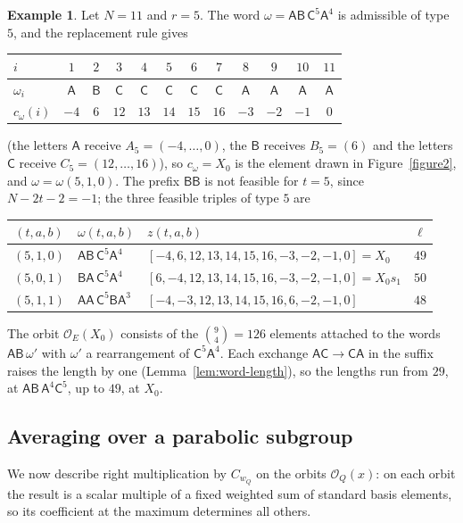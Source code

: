 \documentclass[11pt,a4paper,reqno]{amsart}
\numberwithin{equation}{section}
\theoremstyle{definition}
\newtheorem{example}[theorem]{Example}
\theoremstyle{remark}
\theoremstyle{plain}
\newcommand{\A}{\mathsf A}
\newcommand{\B}{\mathsf B}
\newcommand{\CC}{\mathsf C}
\begin{document}
\begin{example}\label{ex:orbit-X0}
Let $N=11$ and $r=5$. The word $\omega=\A\B\,\CC^5\A^4$ is admissible of type $5$, and the replacement rule gives
\begin{center}
\small
\begin{tabular}{@{}l*{11}{c}@{}}
\toprule
$i$ & $1$ & $2$ & $3$ & $4$ & $5$ & $6$ & $7$ & $8$ & $9$ & $10$ & $11$\\\midrule
$\omega_i$ & $\A$ & $\B$ & $\CC$ & $\CC$ & $\CC$ & $\CC$ & $\CC$ & $\A$ & $\A$ & $\A$ & $\A$\\
$c_\omega(i)$ & $-4$ & $6$ & $12$ & $13$ & $14$ & $15$ & $16$ & $-3$ & $-2$ & $-1$ & $0$\\\bottomrule
\end{tabular}
\end{center}
(the letters $\A$ receive $A_5=(-4,\ldots,0)$, the $\B$ receives $B_5=(6)$ and the letters $\CC$ receive
$C_5=(12,\ldots,16)$), so $c_\omega=X_0$ is the element drawn in Figure~\ref{figure2}, and $\omega=\omega(5,1,0)$.
The prefix $\B\B$ is not feasible for $t=5$, since $N-2t-2=-1$; the three feasible triples of type $5$ are
\begin{center}
\small
\begin{tabular}{@{}cllc@{}}
\toprule
$(t,a,b)$ & $\omega(t,a,b)$ & $z(t,a,b)$ & $\ell$\\\midrule
$(5,1,0)$ & $\A\B\,\CC^5\A^4$ & $[-4,6,12,13,14,15,16,-3,-2,-1,0]=X_0$ & $49$\\
$(5,0,1)$ & $\B\A\,\CC^5\A^4$ & $[6,-4,12,13,14,15,16,-3,-2,-1,0]=X_0s_1$ & $50$\\
$(5,1,1)$ & $\A\A\,\CC^5\B\A^3$ & $[-4,-3,12,13,14,15,16,6,-2,-1,0]$ & $48$\\\bottomrule
\end{tabular}
\end{center}
The orbit $\mathcal O_E(X_0)$ consists of the $\binom94=126$ elements attached to the words $\A\B\,\omega'$ with
$\omega'$ a rearrangement of $\CC^5\A^4$. Each exchange $\A\CC\to\CC\A$ in the suffix raises the length by one
(Lemma~\ref{lem:word-length}), so the lengths run from $29$, at $\A\B\,\A^4\CC^5$, up to $49$, at $X_0$.
\end{example}


\subsection{Averaging over a parabolic subgroup}\label{sec:averaging}

We now describe right multiplication by $C_{w_Q}$ on the orbits $\mathcal O_Q(x)$: on each orbit the result is a scalar
multiple of a fixed weighted sum of standard basis elements, so its coefficient at the maximum determines all others.
\end{document}
